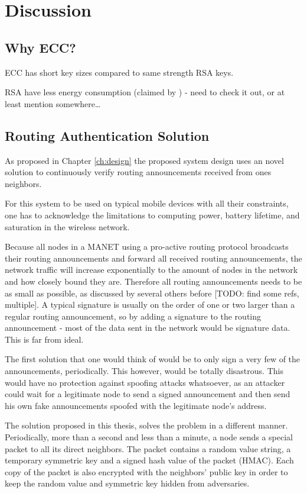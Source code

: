\chapter{Discussion}
\label{ch:discussion}
\acresetall


\section{Why ECC?}
ECC has short key sizes compared to same strength RSA keys.

RSA have less energy consumption (claimed by \cite{hosseinisecure}) - need to
check it out, or at least mention somewhere\ldots

\section{Routing Authentication Solution}
\label{sect:routing_auth_solution}
As proposed in Chapter \ref{ch:design} the proposed system design uses an novel
solution to continuously verify routing announcements received from ones
neighbors.

For this system to be used on typical mobile devices with all their constraints,
one has to acknowledge the limitations to computing power, battery lifetime, and
saturation in the wireless network.

Because all nodes in a \ac{MANET} using a pro-active routing protocol broadcasts
their routing announcements and forward all received routing announcements, the
network traffic will increase exponentially to the amount of nodes in the
network and how closely bound they are. Therefore all routing announcements
needs to be as small as possible, as discussed by several others before [TODO:
find some refs, multiple]. A typical signature is usually on the order of one or
two larger than a regular routing announcement, so by adding a signature to the
routing announcement - most of the data sent in the network would be signature
data. This is far from ideal.

The first solution that one would think of would be to only sign a very few of
the announcements, periodically. This however, would be totally disastrous. This
would have no protection against spoofing attacks whatsoever, as an attacker
could wait for a legitimate node to send a signed announcement and then send his
own fake announcements spoofed with the legitimate node's address.

The solution proposed in this thesis, solves the problem in a different manner.
Periodically, more than a second and less than a minute, a node sends a special
packet to all its direct neighbors. The packet contains a random value string,
a temporary symmetric key and a signed hash value of the packet (HMAC). Each
copy of the packet is also encrypted with the neighbors' public key in order to
keep the random value and symmetric key hidden from adversaries.

